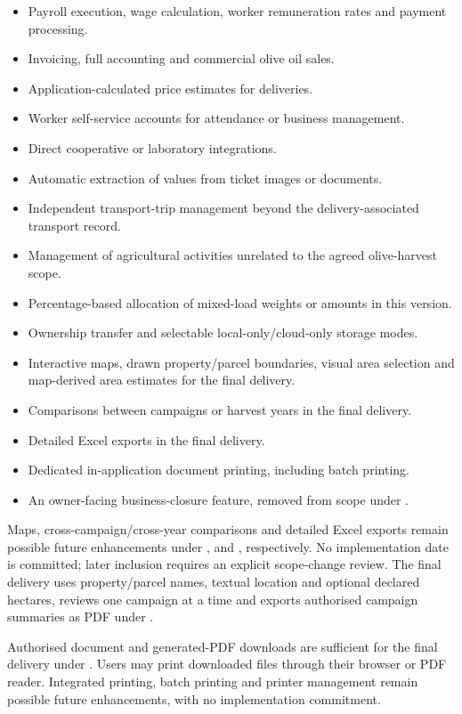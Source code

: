\begin{itemize}
    \item Payroll execution, wage calculation,
    worker remuneration rates and payment processing.
    \item Invoicing, full accounting
    and commercial olive oil sales.
    \item Application-calculated price estimates
    for deliveries.
    \item Worker self-service accounts
    for attendance or business management.
    \item Direct cooperative or laboratory
    integrations.
    \item Automatic extraction of values
    from ticket images or documents.
    \item Independent transport-trip management
    beyond the delivery-associated transport record.
    \item Management of agricultural activities
    unrelated to the agreed olive-harvest scope.
    \item Percentage-based allocation of mixed-load weights or amounts in this version.
    \item Ownership transfer and selectable local-only/cloud-only storage modes.
    \item Interactive maps, drawn property/parcel boundaries, visual area selection
    and map-derived area estimates for the final delivery.
    \item Comparisons between campaigns or harvest years in the final delivery.
    \item Detailed Excel exports in the final delivery.
    \item Dedicated in-application document printing, including batch printing.
    \item An owner-facing business-closure feature, removed from scope under
    .
\end{itemize}

Maps, cross-campaign/cross-year comparisons and detailed Excel exports remain
possible future enhancements under ,
 and , respectively. No implementation
date is committed; later inclusion requires an explicit scope-change review.
The final delivery uses property/parcel names, textual location and optional
declared hectares, reviews one campaign at a time and exports authorised campaign
summaries as PDF under .

Authorised document and generated-PDF downloads are sufficient for the final
delivery under . Users may print downloaded files through
their browser or PDF reader. Integrated printing, batch printing and printer
management remain possible future enhancements, with no implementation commitment.

